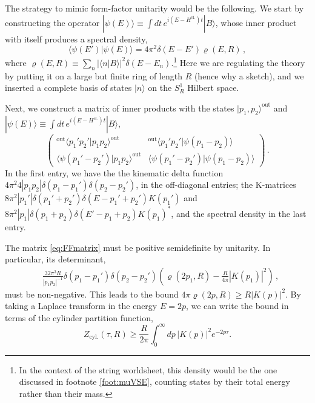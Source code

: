 \documentclass[
 reprint,
 amsmath,
 pre,
 amssymb,
 nofootinbib,
 aps,
 longbibliography,
]{revtex4-1}
\newcommand{\<}{{\langle}}
\renewcommand{\>}{{\rangle}}
\begin{document}
The strategy to mimic form-factor unitarity would be the following. We start by constructing the operator $|\psi(E)\rangle \equiv \int dt\, e^{i (E-H^\text{cl.}) t}|B\rangle$, whose inner product with itself produces a spectral density,
\begin{equation}
    \langle \psi(E')|\psi(E)\rangle =
     4\pi^2 \delta(E-E') \varrho(E,R)\,,
\end{equation}
where $\varrho(E, R) \equiv \sum_n |\langle n |B\rangle|^2\delta(E-E_n)$.\footnote{In the context of the string worldsheet, this density would be the one discussed in footnote \ref{foot:muVSE}, counting states by their total energy rather than their mass.} Here we are regulating the theory by putting it on a large but finite ring of length $R$ (hence why a sketch), and we inserted a complete basis of states $|n\rangle$ on the $S^1_R$ Hilbert space.

Next, we construct a matrix of inner products with the states $|p_1,p_2\rangle^\text{out}$ and $|\psi(E)\rangle \equiv \int dt\, e^{i (E-H^\text{cl.}) t}|B\rangle$,
\begin{equation}\label{eq:FFmatrix}
   \begin{pmatrix}
       {}^\text{out}\langle p_1'p_2'|p_1p_2\rangle^\text{out}
       & {}^\text{out}\langle p_1'p_2'|\psi(p_1-p_2)\rangle  \\
       \langle \psi(p_1'-p_2')|p_1p_2\rangle^\text{out}
       & \langle \psi(p_1'-p_2')|\psi(p_1-p_2)\rangle
   \end{pmatrix}\,.
\end{equation}
In the first entry, we have the the kinematic delta function $4\pi^2 4|p_1p_2| \delta(p_1-p_1') \delta(p_2-p_2')$, in the off-diagonal entries; the K-matrices $8\pi^2|p_1'|\delta(p_1'+p_2')\delta(E-p_1'+p_2') K(p_1')$ and $8\pi^2|p_1|\delta(p_1+p_2)\delta(E'-p_1+p_2) K(p_1)^*$, and the spectral density in the last entry.

The matrix \eqref{eq:FFmatrix} must be positive semidefinite by unitarity. In particular, its determinant,
\begin{align}
    &\frac{32\pi^3R}{|p_1p_2|^{-1}}\delta(p_1-p_1')\delta(p_2-p_2')\left(\varrho(2p_1,R) -\frac{R}{4\pi}|K(p_1)|^2\right)\,,\nonumber
\end{align}
must be non-negative. This leads to the bound $4\pi \varrho(2p, R) \geq R |K(p)|^2$. By taking a Laplace transform in the energy $E=2p$, we can write the bound in terms of the cylinder partition function,
\begin{equation}\label{eq:Z>K}
   Z_{\text{cyl.}}(\tau ,R) \geq \frac{R}{2\pi} \int_0^\infty dp\, |K(p)|^2 e^{-2p\tau}.
\end{equation}
\end{document}
